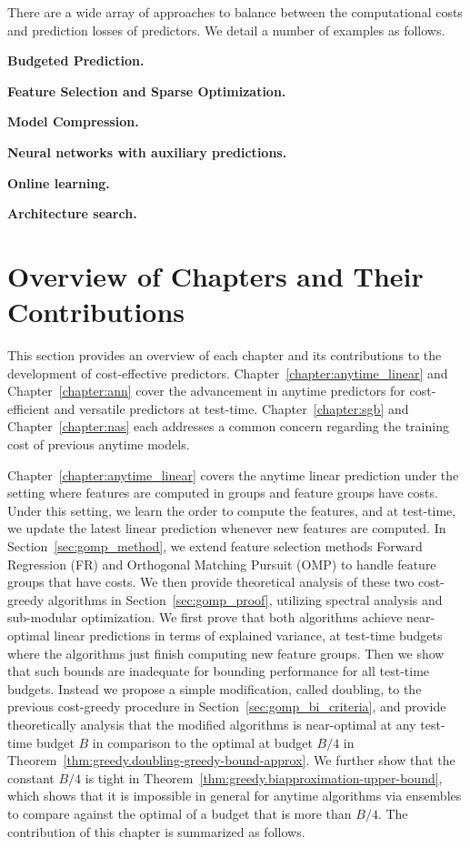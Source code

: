 There are a wide array of approaches to balance between the computational costs and prediction losses of predictors. We detail a number of examples as follows.


\textbf{Budgeted Prediction.}

\textbf{Feature Selection and Sparse Optimization.}

\textbf{Model Compression.}

\textbf{Neural networks with auxiliary predictions.}

\textbf{Online learning.} 

\textbf{Architecture search.}



\section{Overview of Chapters and Their Contributions}

This section provides an overview of each chapter and its contributions to the development of cost-effective predictors. 
Chapter~\ref{chapter:anytime_linear} and Chapter~\ref{chapter:ann} cover the advancement in anytime predictors for cost-efficient and versatile predictors at test-time. Chapter~\ref{chapter:sgb} and Chapter~\ref{chapter:nas} each addresses a common concern regarding the training cost of previous anytime models. 

Chapter~\ref{chapter:anytime_linear} covers the anytime linear prediction under the setting where features are computed in groups and feature groups have costs. Under this setting, we learn the order to compute the features, and at test-time, we update the latest linear prediction whenever new features are computed. In Section~\ref{sec:gomp_method}, we extend feature selection methods Forward Regression (FR) and Orthogonal Matching Pursuit (OMP) to handle feature groups that have costs. We then provide theoretical analysis of these two cost-greedy algorithms in Section~\ref{sec:gomp_proof}, utilizing spectral analysis and sub-modular optimization. We first prove that both algorithms achieve near-optimal linear predictions in terms of explained variance, at test-time budgets where the algorithms just finish computing new feature groups. 
Then we show that such bounds are inadequate for bounding performance for all test-time budgets. Instead we propose a simple modification, called doubling, to the previous cost-greedy procedure in Section~\ref{sec:gomp_bi_criteria}, and provide theoretically analysis that the modified algorithms is near-optimal at any test-time budget $B$ in comparison to the optimal at budget $B/4$ in Theorem~\ref{thm:greedy.doubling-greedy-bound-approx}. We further show that the constant $B/4$ is tight in Theorem~\ref{thm:greedy.biapproximation-upper-bound}, which shows that it is impossible in general for anytime algorithms via ensembles to compare against the optimal of a budget that is more than $B/4$. The contribution of this chapter is summarized as follows.


